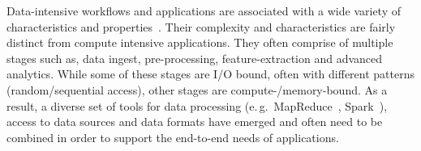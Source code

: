 
Data-intensive workflows and applications are associated with a wide variety of characteristics and properties~\cite{fox2014towards,fox2014big}.
Their complexity and characteristics are fairly distinct from compute intensive applications.
They often comprise of multiple stages such as, data ingest, pre-processing, feature-extraction and advanced analytics.
While some of these stages are I/O bound, often with different patterns (random/sequential access), other stages are compute-/memory-bound.
As a result, a diverse set of tools for data processing (e.\,g.\ MapReduce~\cite{dean2004mapreduce}, Spark~\cite{zaharia2010spark}), access to data sources and data formats have emerged and often need to be combined in order to support the end-to-end needs of applications.


